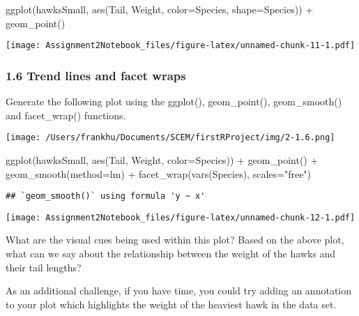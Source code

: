 \documentclass[
]{article}
\newenvironment{Shaded}{\begin{snugshade}}{\end{snugshade}}
\newcommand{\AttributeTok}[1]{\textcolor[rgb]{0.77,0.63,0.00}{#1}}
\newcommand{\FunctionTok}[1]{\textcolor[rgb]{0.00,0.00,0.00}{#1}}
\newcommand{\NormalTok}[1]{#1}
\newcommand{\SpecialCharTok}[1]{\textcolor[rgb]{0.00,0.00,0.00}{#1}}
\newcommand{\StringTok}[1]{\textcolor[rgb]{0.31,0.60,0.02}{#1}}
\begin{document}
\begin{Shaded}
\begin{Highlighting}[]
\FunctionTok{ggplot}\NormalTok{(hawksSmall, }\FunctionTok{aes}\NormalTok{(Tail, Weight, }\AttributeTok{color=}\NormalTok{Species, }\AttributeTok{shape=}\NormalTok{Species)) }\SpecialCharTok{+} \FunctionTok{geom\_point}\NormalTok{()}
\end{Highlighting}
\end{Shaded}

\texttt{[image: Assignment2Notebook\_files/figure-latex/unnamed-chunk-11-1.pdf]}

\hypertarget{trend-lines-and-facet-wraps}{%
\subsubsection{1.6 Trend lines and facet
wraps}\label{trend-lines-and-facet-wraps}}

Generate the following plot using the ggplot(), geom\_point(),
geom\_smooth() and facet\_wrap() functions.

\texttt{[image: /Users/frankhu/Documents/SCEM/firstRProject/img/2-1.6.png]}

\begin{Shaded}
\begin{Highlighting}[]
\FunctionTok{ggplot}\NormalTok{(hawksSmall, }\FunctionTok{aes}\NormalTok{(Tail, Weight, }\AttributeTok{color=}\NormalTok{Species)) }\SpecialCharTok{+} \FunctionTok{geom\_point}\NormalTok{() }\SpecialCharTok{+} \FunctionTok{geom\_smooth}\NormalTok{(}\AttributeTok{method=}\NormalTok{lm) }\SpecialCharTok{+} \FunctionTok{facet\_wrap}\NormalTok{(}\FunctionTok{vars}\NormalTok{(Species), }\AttributeTok{scales=}\StringTok{"free"}\NormalTok{)}
\end{Highlighting}
\end{Shaded}

\begin{verbatim}
## `geom_smooth()` using formula 'y ~ x'
\end{verbatim}

\texttt{[image: Assignment2Notebook\_files/figure-latex/unnamed-chunk-12-1.pdf]}

What are the visual cues being used within this plot? Based on the above
plot, what can we say about the relationship between the weight of the
hawks and their tail lengths?

As an additional challenge, if you have time, you could try adding an
annotation to your plot which highlights the weight of the heaviest hawk
in the data set.
\end{document}
